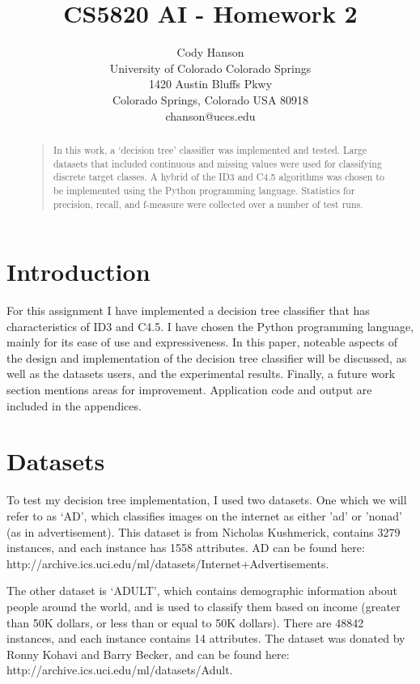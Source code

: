 \documentclass[letterpaper]{article}
\begin{document}
\title{CS5820 AI - Homework 2}
\author{Cody Hanson\\
University of Colorado Colorado Springs\\
1420 Austin Bluffs Pkwy\\
Colorado Springs, Colorado USA 80918\\
chanson@uccs.edu}
\maketitle
\begin{abstract}
\begin{quote}
In this work, a `decision tree' classifier was implemented and tested. 
Large datasets that included continuous and missing values were used for 
classifying discrete target classes. A hybrid of the ID3 and C4.5 algorithms 
was chosen to be implemented using the Python programming language. 
Statistics for precision, recall, and f-measure were collected over 
a number of test runs.
\end{quote}
\end{abstract}

\section{Introduction}

For this assignment I have implemented a decision tree classifier that has 
characteristics of ID3 and C4.5. I have chosen the Python programming language, 
mainly for its ease of use and expressiveness. In this paper, noteable aspects 
of the design and implementation of the decision tree classifier will be 
discussed, as well as the datasets users, and the experimental results. 
Finally, a future work section mentions areas for improvement. 
Application code and output are included in the appendices.

\section{Datasets}
To test my decision tree implementation, I used two datasets. 
One which we will refer to as `AD', which classifies images on the 
internet as either 'ad' or 'nonad' (as in advertisement). This dataset is 
from  Nicholas Kushmerick, contains 3279 instances, and each instance has 
1558 attributes. AD can be found here: http://archive.ics.uci.edu/ml/datasets/Internet+Advertisements.

The other dataset is `ADULT', which contains demographic information about 
people around the world, and is used to classify them based on income 
(greater than 50K dollars, or less than or equal to 50K dollars). 
There are 48842 instances, and each instance contains 14 attributes. 
The dataset was donated by Ronny Kohavi and Barry Becker, 
and can be found here: http://archive.ics.uci.edu/ml/datasets/Adult.
\end{document}
